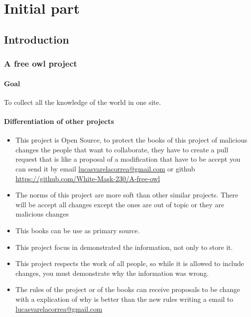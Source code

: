 \documentclass{book}
\begin{document}
    \chapter{Initial part}
        \section{Introduction}
            \subsection{A free owl project}
    
                \subsubsection{Goal}
                    To collect all the knowledge of the world in one site.

                \subsubsection{Differentiation of other projects}
                    \begin{itemize}
                        \item This project is Open Source, to protect the books of this project of malicious changes the people that want to collaborate, they have to create a pull request that is like a proposal of a modification that have to be accept you can send it by email \url{lucasvarelacorrea@gmail.com} or github \url{https://github.com/White-Mask-230/A-free-owl}

                        \item The norms of this project are more soft than other similar projects. There will be accept all changes except the ones are out of topic or they are malicious changes

                        \item This books can be use as primary source.

                        \item This project focus in demonstrated the information, not only to store it.

                        \item This project respects the work of all people, so while it is allowed to include changes, you must demonstrate why the information was wrong.

                        \item The rules of the project or of the books can receive proposals to be change with a explication of why is better than the new rules writing a email to \url{lucasvarelacorrea@gmail.com}
                    \end{itemize}
\end{document}
